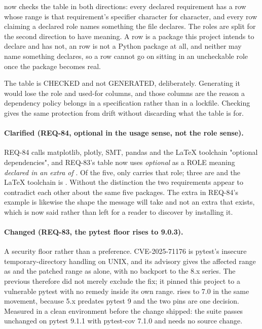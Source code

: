  now checks the table in both
directions: every declared requirement has a row whose range is that
requirement's specifier character for character, and every row claiming
a declared role names something the file declares. The roles are split
for the second direction to have meaning. A  row is a
package this project intends to declare and has not, an 
row is not a Python package at all, and neither may name something
 declares, so a row cannot go on sitting in an
uncheckable role once the package becomes real.

The table is CHECKED and not GENERATED, deliberately. Generating it
would lose the role and used-for columns, and those columns are the
reason a dependency policy belongs in a specification rather than in a
lockfile. Checking gives the same protection from drift without
discarding what the table is for.

\paragraph{Clarified (REQ-84, optional in the usage sense, not the
role sense).} REQ-84 calls matplotlib, plotly, SMT, pandas and the
LaTeX toolchain "optional dependencies", and REQ-83's table now uses
\emph{optional} as a ROLE meaning \emph{declared in an extra of}
. Of the five, only  carries that
role; three are  and the LaTeX toolchain is
. Without the distinction the two requirements appear to
contradict each other about the same five packages. The
 extra in REQ-84's example is likewise the shape the
message will take and not an extra that exists, which is now said
rather than left for a reader to discover by installing it.

\paragraph{Changed (REQ-83, the pytest floor rises to 9.0.3).} A
security floor rather than a preference. CVE-2025-71176 is pytest's
insecure temporary-directory handling on UNIX, and its advisory gives
the affected range as  and the patched range as
 alone, with no backport to the 8.x series. The previous
 therefore did not merely exclude the fix; it pinned
this project to a vulnerable pytest with no remedy inside its own
range.  rises to 7.0 in the same movement, because
5.x predates pytest 9 and the two pins are one decision. Measured in a
clean environment before the change shipped: the suite passes unchanged
on pytest 9.1.1 with pytest-cov 7.1.0 and needs no source change.

